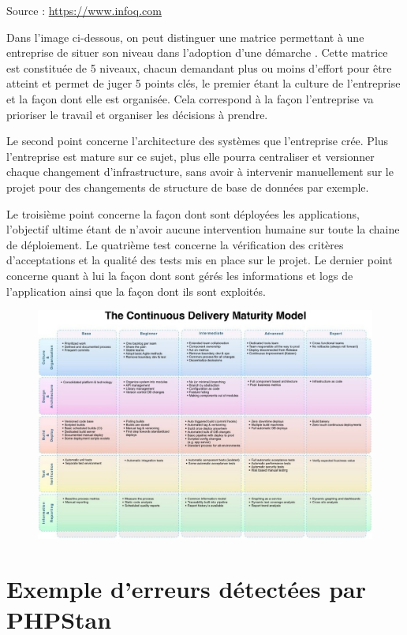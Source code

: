 Source : \url{https://www.infoq.com}

Dans l'image ci-dessous, on peut distinguer une matrice permettant à une entreprise de situer son niveau dans l'adoption d'une démarche \devops. Cette matrice est constituée de 5 niveaux, chacun demandant plus ou moins d'effort pour être atteint et permet de juger 5 points clés, le premier étant la culture de l'entreprise et la façon dont elle est organisée. Cela correspond à la façon l'entreprise va prioriser le travail et organiser les décisions à prendre.

Le second point concerne l'architecture des systèmes que l'entreprise crée. Plus l'entreprise est mature sur ce sujet, plus elle pourra centraliser et versionner chaque changement d'infrastructure, sans avoir à intervenir manuellement sur le projet pour des changements de structure de base de données par exemple. 

Le troisième point concerne la façon dont sont déployées les applications, l'objectif ultime étant de n'avoir aucune intervention humaine sur toute la chaine de déploiement. Le quatrième test concerne la vérification des critères d'acceptations et la qualité des tests mis en place sur le projet. Le dernier point concerne quant à lui la façon dont sont gérés les informations et logs de l'application ainsi que la façon dont ils sont exploités.

\begin{figure}[ht]
	\centering
	\includegraphics[scale=0.62,angle=-90]{img/devops-matrice.jpg}
	\label{annexe:devops-matrice}
\end{figure}

\clearpage
\section{Exemple d'erreurs détectées par PHPStan}

